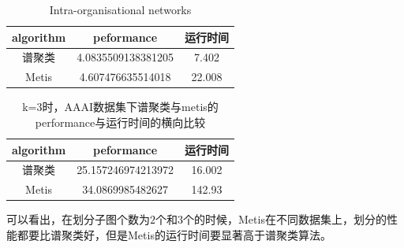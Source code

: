 \begin{table}[htbp]
    \centering
    \begin{tabular}{ccc}
        \hline
        algorithm &peformance &运行时间\\
        \hline
        谱聚类   &4.0835509138381205  &7.402\\
        Metis   &4.607476635514018 &22.008\\
        \hline
    \end{tabular}
    \caption{Intra-organisational networks}
\end{table}


\begin{table}[htbp]
    \centering
    \begin{tabular}{ccc}
        \hline
        algorithm                   &peformance           &运行时间\\
        \hline
        谱聚类             &25.157246974213972           &16.002   \\
        Metis             &34.0869985482627             &142.93\\
        \hline
    \end{tabular}
    \caption{k=3时，AAAI数据集下谱聚类与metis的performance与运行时间的横向比较}
\end{table}

可以看出，在划分子图个数为$2$个和$3$个的时候，Metis在不同数据集上，划分的性能都要比谱聚类好，但是Metis的运行时间要显著高于谱聚类算法。
